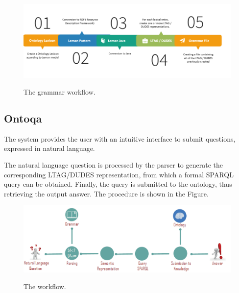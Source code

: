 \begin{figure}[H]
   \centering
    \includegraphics[scale=0.5]{./fig/architecture-grammar}
    \label{fig:ontoqa}
    \caption{The grammar workflow.}
\end{figure}


\subsection{Ontoqa}
The system provides the user with an intuitive interface to submit questions, expressed in natural language.

The natural language question is processed by the parser to generate the corresponding LTAG/DUDES representation, from which a formal SPARQL query can be obtained.
Finally, the query is submitted to the ontology, thus retrieving the output answer.
The procedure is shown in the Figure.







\begin{figure}[H]
   \centering
    \includegraphics[scale=0.5]{./fig/ontoqa}
    \label{fig:ontoqa}
    \caption{The workflow.}
\end{figure}